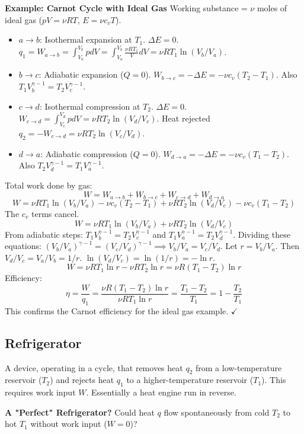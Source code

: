 \documentclass[11pt]{article}
\begin{document}
\textbf{Example: Carnot Cycle with Ideal Gas}
Working substance = $\nu$ moles of ideal gas ($pV=\nu RT$, $E=\nu c_v T$).
\begin{itemize}
    \item $a \to b$: Isothermal expansion at $T_1$. $\Delta E = 0$. $q_1 = W_{a \to b} = \int_{V_a}^{V_b} p dV = \int_{V_a}^{V_b} \frac{\nu RT_1}{V} dV = \nu R T_1 \ln(V_b/V_a)$.
    \item $b \to c$: Adiabatic expansion ($Q=0$). $W_{b \to c} = -\Delta E = - \nu c_v (T_2 - T_1)$. Also $T_1 V_b^{\gamma-1} = T_2 V_c^{\gamma-1}$.
    \item $c \to d$: Isothermal compression at $T_2$. $\Delta E = 0$. $W_{c \to d} = \int_{V_c}^{V_d} p dV = \nu R T_2 \ln(V_d/V_c)$. Heat rejected $q_2 = -W_{c \to d} = \nu R T_2 \ln(V_c/V_d)$.
    \item $d \to a$: Adiabatic compression ($Q=0$). $W_{d \to a} = -\Delta E = - \nu c_v (T_1 - T_2)$. Also $T_2 V_d^{\gamma-1} = T_1 V_a^{\gamma-1}$.
\end{itemize}
Total work done by gas:
\[ W = W_{a \to b} + W_{b \to c} + W_{c \to d} + W_{d \to a} \]
\[ W = \nu R T_1 \ln(V_b/V_a) - \nu c_v (T_2 - T_1) + \nu R T_2 \ln(V_d/V_c) - \nu c_v (T_1 - T_2) \]
The $c_v$ terms cancel.
\[ W = \nu R T_1 \ln(V_b/V_a) + \nu R T_2 \ln(V_d/V_c) \]
From adiabatic steps: $T_1 V_b^{\gamma-1} = T_2 V_c^{\gamma-1}$ and $T_1 V_a^{\gamma-1} = T_2 V_d^{\gamma-1}$.
Dividing these equations: $(V_b/V_a)^{\gamma-1} = (V_c/V_d)^{\gamma-1} \implies V_b/V_a = V_c/V_d$.
Let $r = V_b/V_a$. Then $V_d/V_c = V_a/V_b = 1/r$. $\ln(V_d/V_c) = \ln(1/r) = -\ln r$.
\[ W = \nu R T_1 \ln r - \nu R T_2 \ln r = \nu R (T_1 - T_2) \ln r \]
Efficiency:
\[ \eta = \frac{W}{q_1} = \frac{\nu R (T_1 - T_2) \ln r}{\nu R T_1 \ln r} = \frac{T_1 - T_2}{T_1} = 1 - \frac{T_2}{T_1} \]
This confirms the Carnot efficiency for the ideal gas example. $\checkmark$

\subsection*{Refrigerator}
A device, operating in a cycle, that removes heat $q_2$ from a low-temperature reservoir ($T_2$) and rejects heat $q_1$ to a higher-temperature reservoir ($T_1$). This requires work input $W$. Essentially a heat engine run in reverse.

\textbf{A "Perfect" Refrigerator?}
Could heat $q$ flow spontaneously from cold $T_2$ to hot $T_1$ without work input ($W=0$)?
\end{document}
